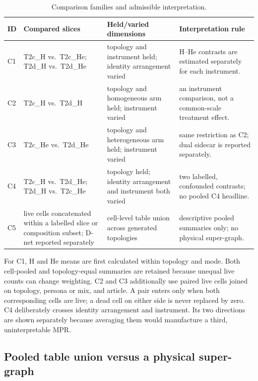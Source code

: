 \begin{table}[htbp]
  \centering
  \caption{Comparison families and admissible interpretation.}
  \label{tab:mm-c1-c5}
  \small
  \begin{tabular}{@{}p{}p{}p{}p{}@{}}
    \hline
    ID & Compared slices & Held/varied dimensions & Interpretation rule\\
    \hline
    C1 &
    T2c\_H vs.\ T2c\_He; T2d\_H vs.\ T2d\_He &
    topology and instrument held; identity arrangement varied &
    H--He contrasts are estimated separately for each instrument.\\

    C2 &
    T2c\_H vs.\ T2d\_H &
    topology and homogeneous arm held; instrument varied &
    an instrument comparison, not a common-scale treatment effect.\\

    C3 &
    T2c\_He vs.\ T2d\_He &
    topology and heterogeneous arm held; instrument varied &
    same restriction as C2; dual sidecar is reported separately.\\

    C4 &
    T2c\_H vs.\ T2d\_He; T2d\_H vs.\ T2c\_He &
    topology held; identity arrangement and instrument both varied &
    two labelled, confounded contrasts; no pooled C4 headline.\\

    C5 &
    live cells concatenated within a labelled slice or composition
    subset; D-net reported separately &
    cell-level table union across generated topologies &
    descriptive pooled summaries only; no physical super-graph.\\
    \hline
  \end{tabular}
\end{table}

For C1, H and He means are first calculated within topology and mode.  Both
cell-pooled and topology-equal summaries are retained because unequal live counts can
change weighting.  C2 and C3 additionally use paired live cells joined on topology,
persona or mix, and article.  A pair enters only when both corresponding cells are
live; a dead cell on either side is never replaced by zero.  C4 deliberately crosses
identity arrangement and instrument.  Its two directions are shown separately because
averaging them would manufacture a third, uninterpretable MPR.

\subsection{Pooled table union versus a physical super-graph}
\label{sec:mm-pooling}

